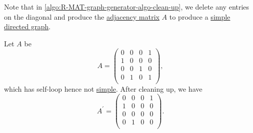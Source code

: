 Note that in \autoref{algo:R-MAT-graph-generator-algo-clean-up}, we delete any entries on the diagonal and produce the \hyperref[def:adjacency-matrix]{adjacency matrix} \(A\) to produce a \hyperref[def:simple-graph]{simple} \hyperref[def:directed-graph]{directed graph}.
\begin{eg}[Clean up]
	Let \(A\) be
	\[
		A = \begin{pmatrix}
			0 & 0 & 0 & 1 \\
			1 & 0 & 0 & 0 \\
			0 & 0 & 1 & 0 \\
			0 & 1 & 0 & 1 \\
		\end{pmatrix},
	\]
	which has self-loop hence not \hyperref[def:simple-graph]{simple}. After cleaning up, we have
	\[
		A^\prime = \begin{pmatrix}
			0 & 0 & 0 & 1 \\
			1 & 0 & 0 & 0 \\
			0 & 0 & 0 & 0 \\
			0 & 1 & 0 & 0 \\
		\end{pmatrix}.
	\]
\end{eg}

